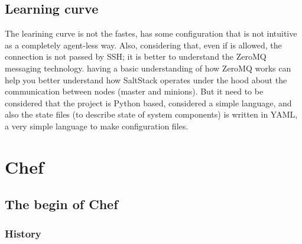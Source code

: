 \documentclass[12pt,a4paper,openright,twoside]{book}
\begin{document}

\section{Learning curve}
The learining curve is not the fastes, has some configuration that is not intuitive as a completely agent-less way.
Also, considering that, even if is allowed, the connection is not passed by SSH; it is better to understand the ZeroMQ messaging technology.
having a basic understanding of how ZeroMQ works can help you better understand how SaltStack operates under the hood about the communication between nodes (master and minions).
But it need to be considered that the project is Python based, considered a simple language, and also the state files (to describe state of system components) is written in YAML, a very simple language to make configuration files.



\chapter{Chef}

\section{The begin of Chef}

\subsection{History}
\end{document}
